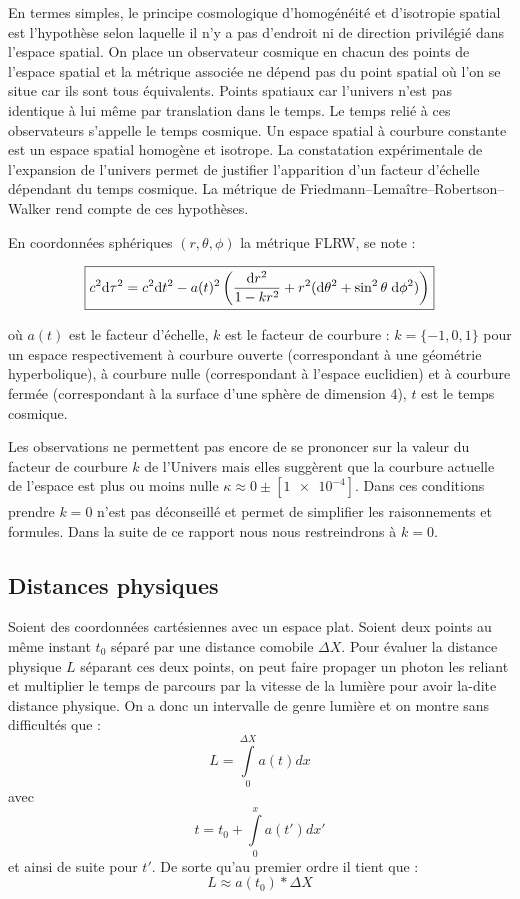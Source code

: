 \documentclass[10pt, a4paper]{report}
\numberwithin{equation}{subsection}
\begin{document}
En termes simples, le principe cosmologique d'homogénéité et d'isotropie spatial est l'hypothèse selon laquelle il n'y a pas d'endroit ni de direction privilégié dans l'espace spatial. On place un observateur cosmique en chacun des points de l'espace spatial et la métrique associée ne dépend pas du point spatial où l'on se situe car ils sont tous équivalents. Points spatiaux car l'univers n'est pas identique à lui même par translation dans le temps. Le temps relié à ces observateurs s'appelle le temps cosmique. Un espace spatial à courbure constante est un espace spatial homogène et isotrope.  La constatation expérimentale de l'expansion de l'univers permet de justifier l'apparition d'un facteur d'échelle dépendant du temps cosmique. La métrique de Friedmann–Lemaître–Robertson–Walker rend compte de ces hypothèses.

En coordonnées sphériques $(r, \theta, \phi)$ la métrique FLRW, se note :

\begin{equation}
\boxed{ c^2 {\rm d}\tau^2 = c^2 {\rm d}t^2 - a(t)^2 \left (\frac{{\rm d}r^2}{1 - k r^2} + r^2 ({\rm d}\theta^2 + \sin^2 \theta \; {\rm d} \phi^2) \right )}
\end{equation}

où $a(t)$ est le facteur d'échelle, $k$ est le facteur de courbure : $k = \{-1,0,1\}$ pour un espace respectivement à courbure ouverte (correspondant à une géométrie hyperbolique), à courbure nulle (correspondant à l'espace euclidien) et à courbure fermée (correspondant à la surface d'une sphère de dimension 4), $t$ est le temps cosmique.

Les observations ne permettent pas encore de se prononcer sur la valeur du facteur de courbure $k$ de l'Univers mais elles suggèrent que la courbure actuelle de l'espace est plus ou moins nulle $ \kappa \approx 0 \pm [\num{1e-4}]$. Dans ces conditions prendre $k=0$ n'est pas déconseillé\textsuperscript{\cite{Weinberg}} et permet de simplifier les raisonnements et formules. Dans la suite de ce rapport nous nous restreindrons à $k=0$. 
\subsection{Distances physiques}
Soient des coordonnées cartésiennes avec un espace plat. Soient deux points au même instant $t_0$ séparé par une distance comobile $\Delta X$. Pour évaluer la distance physique $L$ séparant ces deux points, on peut faire propager un photon les reliant et multiplier le temps de parcours par la vitesse de la lumière pour avoir la-dite distance physique. On a donc un intervalle de genre lumière et on montre sans difficultés que :
\begin{equation}
\boxed{ L=\int\limits_0^{\Delta X} a(t)dx}
\end{equation}
avec \begin{equation}
\boxed{ t=t_0 + \int\limits_0^x a(t')dx'}
\end{equation}
et ainsi de suite pour $t'$.
De sorte qu'au premier ordre il tient que :
\begin{equation} \label{eq:foL}
\boxed{ L \approx a(t_0) * \Delta X}
\end{equation}
\end{document}
